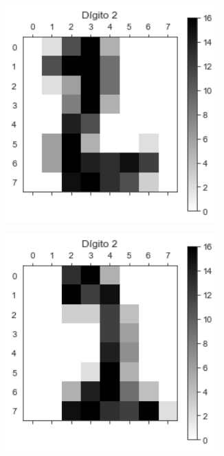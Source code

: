 \documentclass[11pt,a4paper]{article}
\theoremstyle{definition}
\begin{document}
	\begin{figure}[H]
		\centering
		\begin{subfigure}{.33\textwidth}
  		\centering
 		\includegraphics[width=0.9\textwidth]{images/dig2}
  		\label{fig:sub1}
		\end{subfigure}%
		\begin{subfigure}{.33\textwidth}
  		\centering
  		\includegraphics[width=0.9\textwidth]{images/dig22}

\end{subfigure}
\end{figure}
\end{document}
